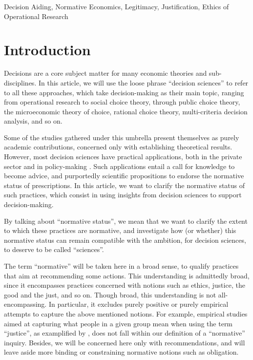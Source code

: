 \documentclass[preprint, french, english, 11pt, authoryear]{elsarticle}%
\begin{document}
\begin{keyword}
Decision Aiding, Normative Economics, Legitimacy, Justification, Ethics of Operational Research
\end{keyword}

\maketitle

\section{Introduction}
Decisions are a core subject matter for many economic theories and sub-disciplines. In this article, we will use the loose phrase “decision sciences” to refer to all these approaches, which take decision-making as their main topic, ranging from operational research to social choice theory, through public choice theory, the microeconomic theory of choice, rational choice theory, multi-criteria decision analysis, and so on.

Some of the studies gathered under this umbrella present themselves as purely academic contributions, concerned only with establishing theoretical results. However, most decision sciences have practical applications, both in the private sector and in policy-making \citep{tsoukias_policy_2013,marchi_evidence-based_2016}. Such applications entail a call for knowledge to become advice, and purportedly scientific propositions to endorse the normative status of prescriptions. 
In this article, we want to clarify the normative status of such practices, which consist in using insights from decision sciences to support decision-making.

By talking about “normative status”, we mean that we want to clarify the extent to which these practices are normative, and investigate how (or whether) this normative status can remain compatible with the ambition, for decision sciences, to deserve to be called ``sciences''. 

The term “normative” will be taken here in a broad sense, to qualify practices that aim at recommending some actions.  This understanding is admittedly broad, since it encompasses practices concerned with notions such as ethics, justice, the good and the just, and so on. 
Though broad, this understanding is not all-encompassing. In particular, it excludes purely positive or purely empirical attempts to capture the above mentioned notions. For example, empirical studies aimed at capturing what people in a given group mean when using the term “justice”, as examplified by \citet{gaertner_empirical_2012}, does not fall within our definition of a “normative” inquiry. Besides, we will be concerned here only with recommendations, and will leave aside more binding or constraining normative notions such as obligation.
\end{document}
